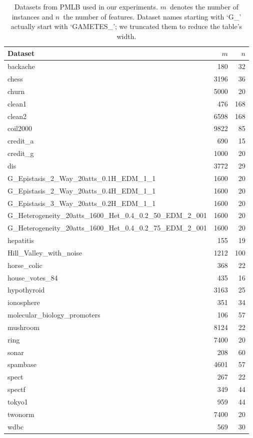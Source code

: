 \documentclass{article}
\theoremstyle{definition}
\begin{document}
\begin{table}[p]
	\centering
	\begin{tabular}{lrr}
		\toprule
		Dataset & $m$ & $n$ \\
		\midrule
		backache & 180 & 32 \\
		chess & 3196 & 36 \\
		churn & 5000 & 20 \\
		clean1 & 476 & 168 \\
		clean2 & 6598 & 168 \\
		coil2000 & 9822 & 85 \\
		credit\_a & 690 & 15 \\
		credit\_g & 1000 & 20 \\
		dis & 3772 & 29 \\
		G\_Epistasis\_2\_Way\_20atts\_0.1H\_EDM\_1\_1 & 1600 & 20 \\
		G\_Epistasis\_2\_Way\_20atts\_0.4H\_EDM\_1\_1 & 1600 & 20 \\
		G\_Epistasis\_3\_Way\_20atts\_0.2H\_EDM\_1\_1 & 1600 & 20 \\
		G\_Heterogeneity\_20atts\_1600\_Het\_0.4\_0.2\_50\_EDM\_2\_001 & 1600 & 20 \\
		G\_Heterogeneity\_20atts\_1600\_Het\_0.4\_0.2\_75\_EDM\_2\_001 & 1600 & 20 \\
		hepatitis & 155 & 19 \\
		Hill\_Valley\_with\_noise & 1212 & 100 \\
		horse\_colic & 368 & 22 \\
		house\_votes\_84 & 435 & 16 \\
		hypothyroid & 3163 & 25 \\
		ionosphere & 351 & 34 \\
		molecular\_biology\_promoters & 106 & 57 \\
		mushroom & 8124 & 22 \\
		ring & 7400 & 20 \\
		sonar & 208 & 60 \\
		spambase & 4601 & 57 \\
		spect & 267 & 22 \\
		spectf & 349 & 44 \\
		tokyo1 & 959 & 44 \\
		twonorm & 7400 & 20 \\
		wdbc & 569 & 30 \\
		\bottomrule
	\end{tabular}
	\caption{
		Datasets from PMLB used in our experiments.
		$m$~denotes the number of instances and $n$~the number of features.
		Dataset names starting with `G\_' actually start with `GAMETES\_'; we truncated them to reduce the table's width.
	}
	\label{tab:afs:datasets}
\end{table}
\end{document}
